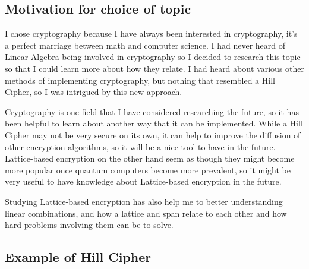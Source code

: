 \documentclass{../mathhomework}
\begin{document}
\subsection{Motivation for choice of topic}

I chose cryptography because I have always been interested in cryptography, it's a perfect marriage between
math and computer science. I had never heard of Linear Algebra being involved in cryptography so I decided to
research this topic so that I could learn more about how they relate. I had heard about various other methods
of implementing cryptography, but nothing that resembled a Hill Cipher, so I was intrigued by this new approach.

Cryptography is one field that I have considered researching the future, so it has been helpful to learn about
another way that it can be implemented. While a Hill Cipher may not be very secure on its own, it can help to
improve the diffusion of other encryption algorithms, so it will be a nice tool to have in the future. 
Lattice-based encryption on the other hand seem as though they might become more popular once quantum computers
become more prevalent, so it might be very useful to have knowledge about Lattice-based encryption in the future.

Studying Lattice-based encryption has also help me to better understanding linear combinations, and how a lattice
and span relate to each other and how hard problems involving them can be to solve.

\subsection{Example of Hill Cipher}
\end{document}
